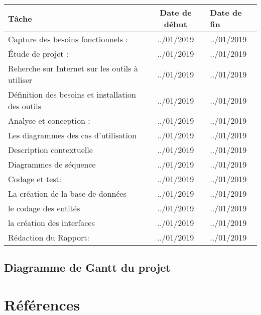 \documentclass[12pt,a4paper]{article}
\begin{document}
\begin{tabularx}{\textwidth}{|l|c|X|}
  \hline
  \textbf{Tâche } & 
  \textbf{Date de début} & 
  \textbf{Date de fin} \\
  \hline
  \hline
  \hline
  Capture des besoins fonctionnels :& ../01/2019 & ../01/2019
  \\ 
   \hline
    \hline
     \hline
 
 Étude de projet : & ../01/2019 &  ../01/2019
    \\
  \hline
 Reherche sur Internet sur les outils à utiliser  & ../01/2019 &  ../01/2019
    \\
  \hline
 Définition des besoins et installation des outils  & ../01/2019 &  ../01/2019
    \\
  \hline
 \hline
  \hline
  Analyse et conception :& ../01/2019 & ../01/2019
  \\ 
   \hline
  \hline
   \hline
  Les diagrammes des cas d'utilisation & ../01/2019 &  ../01/2019 
    \\
  \hline
 Description contextuelle & ../01/2019 &  ../01/2019
    \\
  \hline
  Diagrammes de séquence & ../01/2019 &  ../01/2019
    \\
    \hline
     \hline
      \hline
 
Codage et test: & ../01/2019 &  ../01/2019
    \\
      \hline
       \hline
        \hline
    
La création de la base de données & ../01/2019 &  ../01/2019
    \\
     \hline
le codage des entités & ../01/2019 &  ../01/2019
    \\
         \hline
la création des interfaces & ../01/2019 &  ../01/2019
    \\
       \hline
        \hline
         \hline

Rédaction du Rapport: & ../01/2019 &  ../01/2019
  \\
  \hline
   \hline
    \hline

\end{tabularx}

\subsection{Diagramme de Gantt du projet}

\section{Références}
\end{document}
